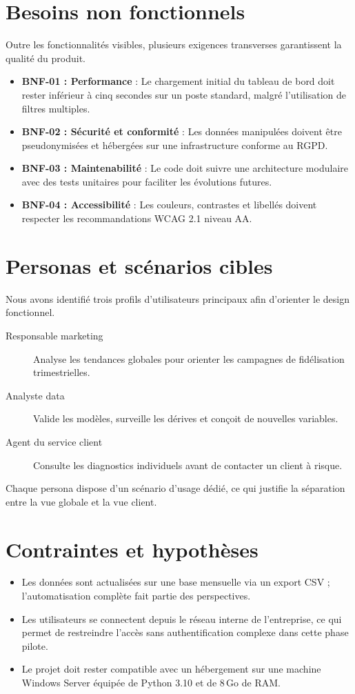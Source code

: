 \section{Besoins non fonctionnels}
Outre les fonctionnalités visibles, plusieurs exigences transverses garantissent la qualité du produit.
\begin{itemize}
    \item \textbf{BNF-01 : Performance} : Le chargement initial du tableau de bord doit rester inférieur à cinq secondes sur un poste standard, malgré l'utilisation de filtres multiples.
    \item \textbf{BNF-02 : Sécurité et conformité} : Les données manipulées doivent être pseudonymisées et hébergées sur une infrastructure conforme au RGPD.
    \item \textbf{BNF-03 : Maintenabilité} : Le code doit suivre une architecture modulaire avec des tests unitaires pour faciliter les évolutions futures.
    \item \textbf{BNF-04 : Accessibilité} : Les couleurs, contrastes et libellés doivent respecter les recommandations WCAG 2.1 niveau AA.
\end{itemize}

\section{Personas et scénarios cibles}
Nous avons identifié trois profils d'utilisateurs principaux afin d'orienter le design fonctionnel.
\begin{description}
    \item[Responsable marketing] Analyse les tendances globales pour orienter les campagnes de fidélisation trimestrielles.
    \item[Analyste data] Valide les modèles, surveille les dérives et conçoit de nouvelles variables.
    \item[Agent du service client] Consulte les diagnostics individuels avant de contacter un client à risque.
\end{description}
Chaque persona dispose d'un scénario d'usage dédié, ce qui justifie la séparation entre la vue globale et la vue client.

\section{Contraintes et hypothèses}
\begin{itemize}
    \item Les données sont actualisées sur une base mensuelle via un export CSV ; l'automatisation complète fait partie des perspectives.
    \item Les utilisateurs se connectent depuis le réseau interne de l'entreprise, ce qui permet de restreindre l'accès sans authentification complexe dans cette phase pilote.
    \item Le projet doit rester compatible avec un hébergement sur une machine Windows Server équipée de Python 3.10 et de 8\,Go de RAM.
\end{itemize}

